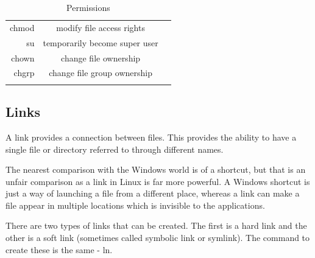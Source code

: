 \documentclass{article}
\begin{document}
\begin{table}[htb]
\caption{Permissions}
\label {Permissions}
\begin{tabular}{rcc}
\noalign{\smallskip} \hline\hline \noalign{\smallskip}
chmod & modify file access rights\\
su & temporarily become super user\\
chown & change file ownership\\
chgrp & change file group ownership\\
\noalign{\smallskip} \hline\hline \noalign{\smallskip}
\end{tabular}
\end{table}

\subsection{Links}

A link provides a connection between files. This provides the ability to have a single file or directory referred to through different names.

	The nearest comparison with the Windows world is of a shortcut, but that is an unfair comparison as a link in Linux is far more powerful. A Windows shortcut is just a way of launching a file from a different place, whereas a link can make a file appear in multiple locations which is invisible to the applications.

	There are two types of links that can be created. The first is a hard link and the other is a soft link (sometimes called symbolic link or symlink). The command to create these is the same - ln.
	
\end{document}

